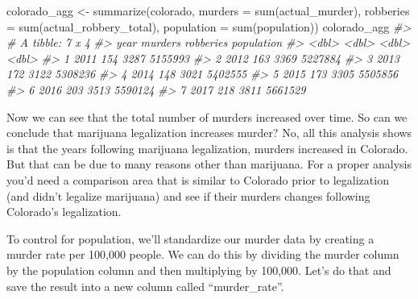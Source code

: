 \documentclass[
]{krantz}
\makeatletter
\newenvironment{Shaded}{\begin{snugshade}}{\end{snugshade}}
\newcommand{\AttributeTok}[1]{\textcolor[rgb]{0.61,0.61,0.61}{#1}}
\newcommand{\CommentTok}[1]{\textcolor[rgb]{0.37,0.37,0.37}{\textit{#1}}}
\newcommand{\DecValTok}[1]{\textcolor[rgb]{0.06,0.06,0.06}{#1}}
\newcommand{\FunctionTok}[1]{\textcolor[rgb]{0,0,0}{#1}}
\newcommand{\NormalTok}[1]{#1}
\newcommand{\OtherTok}[1]{\textcolor[rgb]{0.37,0.37,0.37}{#1}}
\newcommand{\SpecialCharTok}[1]{\textcolor[rgb]{0,0,0}{#1}}
\newenvironment{kframe}{%
\medskip{}
\setlength{\fboxsep}{.8em}
 \def\at@end@of@kframe{}%
 \ifinner\ifhmode%
  \def\at@end@of@kframe{\end{minipage}}%
  \begin{minipage}{\columnwidth}%
 \fi\fi%
 \def\FrameCommand##1{\hskip\@totalleftmargin \hskip-\fboxsep
 \colorbox{shadecolor}{##1}\hskip-\fboxsep
     \hskip-\linewidth \hskip-\@totalleftmargin \hskip\columnwidth}%
 \MakeFramed {\advance\hsize-\width
   \@totalleftmargin\z@ \linewidth\hsize
   \@setminipage}}%
 {\par\unskip\endMakeFramed%
 \at@end@of@kframe}
\renewenvironment{Shaded}{\begin{kframe}}{\end{kframe}}
\makeatother
\begin{document}
\begin{Shaded}
\begin{Highlighting}[]
\NormalTok{colorado\_agg }\OtherTok{\textless{}{-}} \FunctionTok{summarize}\NormalTok{(colorado, }\AttributeTok{murders =} \FunctionTok{sum}\NormalTok{(actual\_murder), }\AttributeTok{robberies =} \FunctionTok{sum}\NormalTok{(actual\_robbery\_total), }\AttributeTok{population =} \FunctionTok{sum}\NormalTok{(population))}
\NormalTok{colorado\_agg}
\CommentTok{\#\textgreater{} \# A tibble: 7 x 4}
\CommentTok{\#\textgreater{}    year murders robberies population}
\CommentTok{\#\textgreater{}   \textless{}dbl\textgreater{}   \textless{}dbl\textgreater{}     \textless{}dbl\textgreater{}      \textless{}dbl\textgreater{}}
\CommentTok{\#\textgreater{} 1  2011     154      3287    5155993}
\CommentTok{\#\textgreater{} 2  2012     163      3369    5227884}
\CommentTok{\#\textgreater{} 3  2013     172      3122    5308236}
\CommentTok{\#\textgreater{} 4  2014     148      3021    5402555}
\CommentTok{\#\textgreater{} 5  2015     173      3305    5505856}
\CommentTok{\#\textgreater{} 6  2016     203      3513    5590124}
\CommentTok{\#\textgreater{} 7  2017     218      3811    5661529}
\end{Highlighting}
\end{Shaded}

Now we can see that the total number of murders increased over time. So can we conclude that marijuana legalization increases murder? No, all this analysis shows is that the years following marijuana legalization, murders increased in Colorado. But that can be due to many reasons other than marijuana. For a proper analysis you'd need a comparison area that is similar to Colorado prior to legalization (and didn't legalize marijuana) and see if their murders changes following Colorado's legalization.

To control for population, we'll standardize our murder data by creating a murder rate per 100,000 people. We can do this by dividing the murder column by the population column and then multiplying by 100,000. Let's do that and save the result into a new column called ``murder\_rate''.

\begin{Shaded}
\end{Shaded}
\end{document}

